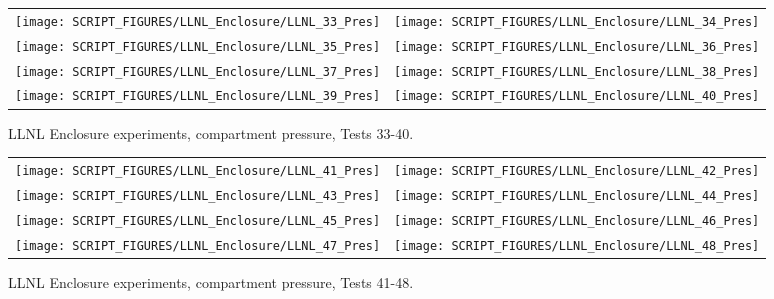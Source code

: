 \begin{figure}[p]
\begin{tabular*}{\textwidth}{l@{\extracolsep{\fill}}r}
\texttt{[image: SCRIPT\_FIGURES/LLNL\_Enclosure/LLNL\_33\_Pres]} &
\texttt{[image: SCRIPT\_FIGURES/LLNL\_Enclosure/LLNL\_34\_Pres]} \\
\texttt{[image: SCRIPT\_FIGURES/LLNL\_Enclosure/LLNL\_35\_Pres]} &
\texttt{[image: SCRIPT\_FIGURES/LLNL\_Enclosure/LLNL\_36\_Pres]} \\
\texttt{[image: SCRIPT\_FIGURES/LLNL\_Enclosure/LLNL\_37\_Pres]} &
\texttt{[image: SCRIPT\_FIGURES/LLNL\_Enclosure/LLNL\_38\_Pres]} \\
\texttt{[image: SCRIPT\_FIGURES/LLNL\_Enclosure/LLNL\_39\_Pres]} &
\texttt{[image: SCRIPT\_FIGURES/LLNL\_Enclosure/LLNL\_40\_Pres]}
\end{tabular*}
\caption[LLNL Enclosure experiments, compartment pressure, Tests 33-40]{LLNL Enclosure experiments, compartment pressure, Tests 33-40.}
\label{LLNL_Enclosure_Pres_5}
\end{figure}

\begin{figure}[p]
\begin{tabular*}{\textwidth}{l@{\extracolsep{\fill}}r}
\texttt{[image: SCRIPT\_FIGURES/LLNL\_Enclosure/LLNL\_41\_Pres]} &
\texttt{[image: SCRIPT\_FIGURES/LLNL\_Enclosure/LLNL\_42\_Pres]} \\
\texttt{[image: SCRIPT\_FIGURES/LLNL\_Enclosure/LLNL\_43\_Pres]} &
\texttt{[image: SCRIPT\_FIGURES/LLNL\_Enclosure/LLNL\_44\_Pres]} \\
\texttt{[image: SCRIPT\_FIGURES/LLNL\_Enclosure/LLNL\_45\_Pres]} &
\texttt{[image: SCRIPT\_FIGURES/LLNL\_Enclosure/LLNL\_46\_Pres]} \\
\texttt{[image: SCRIPT\_FIGURES/LLNL\_Enclosure/LLNL\_47\_Pres]} &
\texttt{[image: SCRIPT\_FIGURES/LLNL\_Enclosure/LLNL\_48\_Pres]}
\end{tabular*}
\caption[LLNL Enclosure experiments, compartment pressure, Tests 41-48]{LLNL Enclosure experiments, compartment pressure, Tests 41-48.}
\label{LLNL_Enclosure_Pres_6}
\end{figure}

